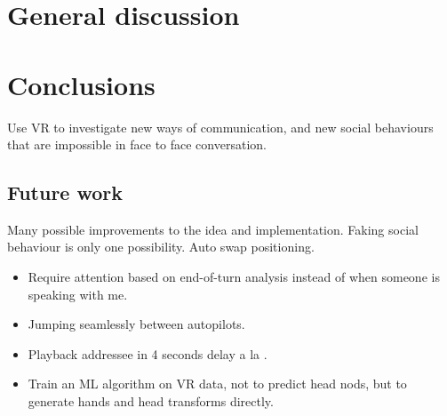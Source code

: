 \documentclass[]{simple-thesis}
\begin{document}
\chapter{General discussion}


\chapter{Conclusions}

Use VR to investigate new ways of communication, and new social behaviours that are impossible in face to face conversation.

\section{Future work}

Many possible improvements to the idea and implementation.
Faking social behaviour is only one possibility.
Auto swap positioning.

\begin{itemize}
  \item Require attention based on end-of-turn analysis instead of when someone is speaking with me.
  \item Jumping seamlessly between autopilots.
  \item Playback addressee in 4 seconds delay a la \cite{Bailenson2005}.
  \item Train an ML algorithm on VR data, not to predict head nods, but to generate hands and head transforms directly.
\end{itemize}


\cleardoublepage
{}
{}


\end{document}
